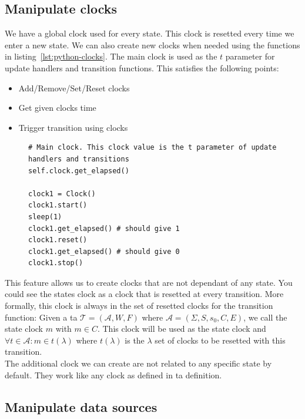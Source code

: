 \documentclass[12pt]{article}
\theoremstyle{definition}
\theoremstyle{definition}
\theoremstyle{remark}
\newcommand{\A}{\mathcal{A}}
\begin{document}
\subsection{Manipulate clocks}\label{ManipulateClocks}

We have a global clock used for every state. This clock is resetted every time we enter a new state. We can also create new clocks when needed using the functions in listing~\ref{lst:python-clocks}. The main clock is used as the $t$ parameter for update handlers and transition functions. This satisfies the following points:
\begin{itemize}
\item Add/Remove/Set/Reset clocks
\item Get given clocks time
\item Trigger transition using clocks
\end{itemize}


\begin{figure}[H]
    \begin{lstlisting}[caption="Set the initial state",label={lst:python-clocks}]
# Main clock. This clock value is the t parameter of update handlers and transitions
self.clock.get_elapsed()

clock1 = Clock()
clock1.start()
sleep(1)
clock1.get_elapsed() # should give 1
clock1.reset()
clock1.get_elapsed() # should give 0
clock1.stop()
    \end{lstlisting}
\end{figure}

This feature allows us to create clocks that are not dependant of any state. You could see the states clock as a clock that is resetted at every transition. More formally, this clock is always in the set of resetted clocks for the transition function: Given a \gls{ta} $\mathcal{T} = (\A, W, F)$ where $\A = (\Sigma, S, s_{0},C, E)$, we call the state clock $m$ with $m \in C$. This clock will be used as the state clock and $\forall t \in \A: m \in t(\lambda)$ where $t(\lambda)$ is the $\lambda$ set of clocks to be resetted with this transition.\\

The additional clock we can create are not related to any specific state by default. They work like any clock as defined in \gls{ta} definition.


\subsection{Manipulate data sources}
\end{document}
